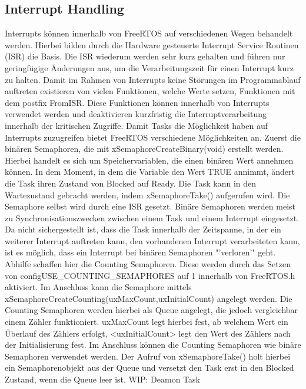 \subsection{Interrupt Handling}
Interrupts können innerhalb von FreeRTOS auf verschiedenen Wegen behandelt werden. Hierbei bilden durch die Hardware gesteuerte Interrupt Service Routinen (ISR) die Basis. Die ISR wiederum werden sehr kurz gehalten und führen nur geringfügige Änderungen aus, um die Verarbeitungszeit für einen Interrupt kurz zu halten. Damit im Rahmen von Interrupts keine Störungen im Programmablauf auftreten existieren von vielen Funktionen, welche Werte setzen, Funktionen mit dem postfix FromISR. Diese Funktionen können innerhalb von Interrupts verwendet werden und deaktivieren kurzfristig die Interruptverarbeitung innerhalb der kritischen Zugriffe.
Damit Tasks die Möglichkeit haben auf Interrupts zuzugreifen bietet FreeRTOS verschiedene Möglichkeiten an. Zuerst die binären Semaphoren, die mit xSemaphoreCreateBinary(void) erstellt werden. Hierbei handelt es sich um Speichervariablen, die einen binären Wert annehmen können. In dem Moment, in dem die Variable den Wert TRUE annimmt, ändert die Task ihren Zustand von Blocked auf Ready. Die Task kann in den Wartezustand gebracht werden, indem xSemaphoreTake() aufgerufen wird. Die Semaphore selbst wird durch eine ISR gesetzt. Binäre Semaphoren werden meist zu Synchronisationszwecken zwischen einem Task und einem Interrupt eingesetzt.
Da nicht sichergestellt ist, dass die Task innerhalb der Zeitspanne, in der ein weiterer Interrupt auftreten kann, den vorhandenen Interrupt verarbeiteten kann, ist es möglich, dass ein Interrupt bei binären Semaphoren "'verloren'" geht. Abhilfe schaffen hier die Counting Semaphoren. Diese werden durch das Setzen von configUSE\_COUNTING\_SEMAPHORES auf 1 innerhalb von FreeRTOS.h aktiviert. Im Anschluss kann die Semaphore mittels xSemaphoreCreateCounting(uxMaxCount,uxInitialCount) angelegt werden. Die Counting Semaphoren werden hierbei als Queue angelegt, die jedoch vergleichbar einem Zähler funktioniert. uxMaxCount legt hierbei fest, ab welchem Wert ein Überlauf des Zählers erfolgt, <uxInitialCount> legt den Wert des Zählers nach der Initialisierung fest. Im Anschluss können die Counting Semaphoren wie binäre Semaphoren verwendet werden. Der Aufruf von xSemaphoreTake() holt hierbei ein Semaphorenobjekt aus der Queue und versetzt den Task erst in den Blocked Zustand, wenn die Queue leer ist.
WIP: Deamon Task
